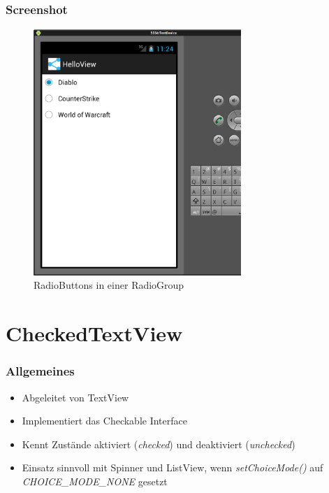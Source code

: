 \begin{frame}
   \frametitle{Screenshot}
	\begin{figure}[h!]
	  \centering
	  \includegraphics[width=0.7\textwidth]{pictures/radio_group.ps}
	  \caption{
		  RadioButtons in einer RadioGroup
	  }
	  \label{fig:radio_group}
	\end{figure}
\end{frame}

\section{CheckedTextView}
\begin{frame}
   \frametitle{Allgemeines}
   \begin{itemize}
      \item Abgeleitet von TextView
      \item Implementiert das Checkable Interface
      \item Kennt Zustände aktiviert (\emph{checked}) und deaktiviert (\emph{unchecked})
      \item Einsatz sinnvoll mit Spinner und ListView, wenn \emph{setChoiceMode()} 
      	auf \emph{CHOICE\_MODE\_NONE} gesetzt
   \end{itemize}
   
	
\end{frame}

